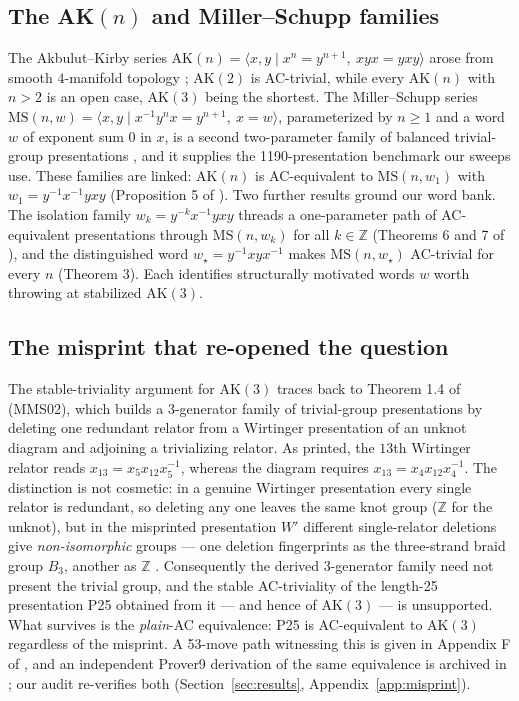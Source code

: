 \subsection{The AK$(n)$ and Miller--Schupp families}

The Akbulut--Kirby series $\mathrm{AK}(n)=\langle x,y \mid x^{n}=y^{n+1},\ xyx=yxy\rangle$
arose from smooth $4$-manifold topology \cite{akbulut1985ac}; $\mathrm{AK}(2)$ is
AC-trivial, while every $\mathrm{AK}(n)$ with $n>2$ is an open case, $\mathrm{AK}(3)$ being
the shortest. The Miller--Schupp series $\mathrm{MS}(n,w)=\langle x,y \mid
x^{-1}y^{n}x=y^{n+1},\ x=w\rangle$, parameterized by $n\ge 1$ and a word $w$ of exponent
sum $0$ in $x$, is a second two-parameter family of balanced trivial-group presentations
\cite{miller1999ms}, and it supplies the 1190-presentation benchmark our sweeps use. These
families are linked: $\mathrm{AK}(n)$ is AC-equivalent to $\mathrm{MS}(n,w_1)$ with
$w_1=y^{-1}x^{-1}yxy$ (Proposition 5 of \cite{shehper2024hard}). Two further results ground
our word bank. The isolation family $w_k=y^{-k}x^{-1}yxy$ threads a one-parameter path of
AC-equivalent presentations through $\mathrm{MS}(n,w_k)$ for all $k\in\mathbb{Z}$ (Theorems
6 and 7 of \cite{shehper2024hard}), and the distinguished word $w_\star=y^{-1}xyx^{-1}$
makes $\mathrm{MS}(n,w_\star)$ AC-trivial for every $n$ (Theorem 3). Each identifies
structurally motivated words $w$ worth throwing at stabilized $\mathrm{AK}(3)$.

\subsection{The misprint that re-opened the question}

The stable-triviality argument for $\mathrm{AK}(3)$ traces back to Theorem 1.4 of
\cite{myasnikov2002ac} (MMS02), which builds a $3$-generator family of trivial-group
presentations by deleting one redundant relator from a Wirtinger presentation of an unknot
diagram and adjoining a trivializing relator. As printed, the $13$th Wirtinger relator
reads $x_{13}=x_5 x_{12} x_5^{-1}$, whereas the diagram requires $x_{13}=x_4 x_{12}
x_4^{-1}$. The distinction is not cosmetic: in a genuine Wirtinger presentation every
single relator is redundant, so deleting any one leaves the same knot group ($\mathbb{Z}$
for the unknot), but in the misprinted presentation $W'$ different single-relator
deletions give \emph{non-isomorphic} groups --- one deletion fingerprints as the
three-strand braid group $B_3$, another as $\mathbb{Z}$ \cite{shehper2024hard}.
Consequently the derived $3$-generator family need not present the trivial group, and the
stable AC-triviality of the length-25 presentation P25 obtained from it --- and hence of
$\mathrm{AK}(3)$ --- is unsupported. What survives is the \emph{plain}-AC equivalence: P25 is
AC-equivalent to $\mathrm{AK}(3)$ regardless of the misprint. A 53-move path witnessing
this is given in Appendix F of \cite{shehper2024hard}, and an independent Prover9
derivation of the same equivalence is archived in \cite{lisitsa2025ak3,lisitsa_zenodo};
our audit re-verifies both (Section~\ref{sec:results}, Appendix~\ref{app:misprint}).

